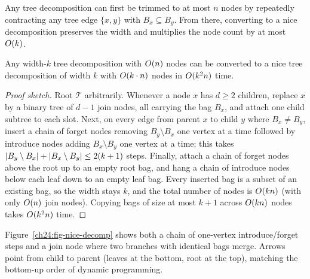 Any tree decomposition can first be trimmed to at most $n$ nodes by repeatedly
contracting any tree edge $\{x,y\}$ with $B_x\subseteq B_y$. From there, converting
to a nice decomposition preserves the width and multiplies the node count by at
most $O(k)$.

\begin{proposition}
\label{ch24:prop-nice}
Any width-$k$ tree decomposition with $O(n)$ nodes can be converted to a nice
tree decomposition of width $k$ with $O(k\cdot n)$ nodes in $O(k^2 n)$ time.
\end{proposition}

\begin{proof}[Proof sketch]
Root $\mathcal{T}$ arbitrarily. Whenever a node $x$ has $d\ge 2$ children, replace
$x$ by a binary tree of $d-1$ join nodes, all carrying the bag $B_x$, and attach
one child subtree to each slot. Next, on every edge from parent $x$ to child $y$
where $B_x\ne B_y$, insert a chain of forget nodes removing $B_y\setminus B_x$ one
vertex at a time followed by introduce nodes adding $B_x\setminus B_y$ one vertex
at a time; this takes $\lvert B_y\setminus B_x\rvert+\lvert B_x\setminus B_y\rvert\le 2(k+1)$
steps. Finally, attach a chain of forget nodes above the root up to an empty root
bag, and hang a chain of introduce nodes below each leaf down to an empty leaf bag.
Every inserted bag is a subset of an existing bag, so the width stays $k$, and the
total number of nodes is $O(kn)$ (with only $O(n)$ join nodes). Copying bags
of size at most $k+1$ across $O(kn)$ nodes takes $O(k^2 n)$ time.
\end{proof}

Figure~\ref{ch24:fig-nice-decomp} shows both a chain of one-vertex introduce/forget
steps and a join node where two branches with identical bags merge. Arrows point
from child to parent (leaves at the bottom, root at the top), matching the
bottom-up order of dynamic programming.

